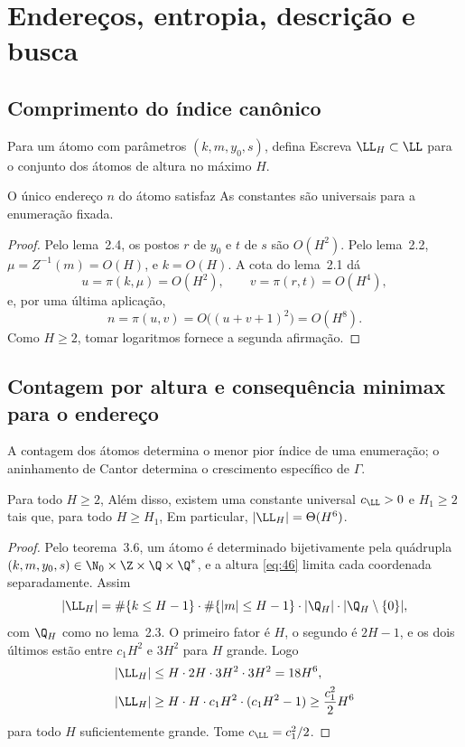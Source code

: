 \section{Endereços, entropia, descrição e busca}
\subsection{Comprimento do índice canônico}
Para um átomo com parâmetros $(k,m,y_0,s)$, defina
Escreva $\LL_H\subset\LL$ para o conjunto dos átomos de altura no máximo $H$.

\begin{teorema}
O único endereço $n$ do átomo satisfaz
As constantes são universais para a enumeração fixada.
\end{teorema}
\begin{proof}
Pelo lema~2.4, os postos $r$ de $y_0$ e $t$ de $s$ são $O(H^2)$. Pelo lema~2.2, $\mu=Z^{-1}(m)=O(H)$, e $k=O(H)$. A cota do lema~2.1 dá
\[
u=\pi(k,\mu)=O(H^2),\qquad v=\pi(r,t)=O(H^4),
\]
e, por uma última aplicação,
\[
n=\pi(u,v)=O\bigl((u+v+1)^2\bigr)=O(H^8).
\]
Como $H\ge2$, tomar logaritmos fornece a segunda afirmação.
\end{proof}

\subsection{Contagem por altura e consequência minimax para o endereço}
A contagem dos átomos determina o menor pior índice de uma enumeração; o aninhamento de Cantor determina o crescimento específico de $\Gamma$.
\begin{lema}
Para todo $H\ge2$,
Além disso, existem uma constante universal $c_{\LL}>0$ e $H_1\ge2$ tais que, para todo $H\ge H_1$,
Em particular, $|\LL_H|=\Theta(H^6)$.
\end{lema}
\begin{proof}
Pelo teorema~3.6, um átomo é determinado bijetivamente pela quádrupla $(k,m,y_0,s)\in\N_0\times\Z\times\Q\times\Q^*$, e a altura \eqref{eq:46} limita cada coordenada separadamente. Assim
\[
|\LL_H|=\#\{k\le H-1\}\cdot\#\{|m|\le H-1\}\cdot|\Q_H|\cdot|\Q_H\setminus\{0\}|,
\]
com $\Q_H$ como no lema~2.3. O primeiro fator é $H$, o segundo é $2H-1$, e os dois últimos estão entre $c_1H^2$ e $3H^2$ para $H$ grande. Logo
\begin{align*}
|\LL_H|&\le H\cdot2H\cdot3H^2\cdot3H^2=18H^6,\\
|\LL_H|&\ge H\cdot H\cdot c_1H^2\cdot(c_1H^2-1)\ge\frac{c_1^2}2H^6
\end{align*}
para todo $H$ suficientemente grande. Tome $c_{\LL}=c_1^2/2$.
\end{proof}

